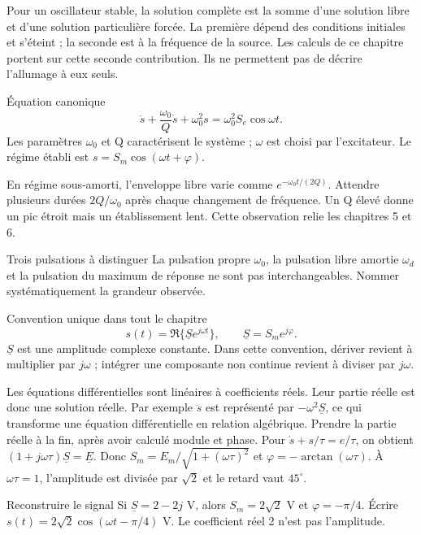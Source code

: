 Pour un oscillateur stable, la solution complète est la somme d’une solution libre et d’une solution particulière forcée. La première dépend des conditions initiales et s’éteint ; la seconde est à la fréquence de la source. Les calculs de ce chapitre portent sur cette seconde contribution. Ils ne permettent pas de décrire l’allumage à eux seuls.
\begin{loi}{Équation canonique}
\[\ddot s+\frac{\omega_0}{Q}\dot s+\omega_0^2s=\omega_0^2 S_e\cos\omega t.\]Les paramètres $\omega_0$ et Q caractérisent le système ; $\omega$ est choisi par l’excitateur. Le régime établi est $s=S_m\cos(\omega t+\varphi)$.
\end{loi}
En régime sous-amorti, l’enveloppe libre varie comme $e^{-\omega_0t/(2Q)}$. Attendre plusieurs durées $2Q/\omega_0$ après chaque changement de fréquence. Un Q élevé donne un pic étroit mais un établissement lent. Cette observation relie les chapitres 5 et 6.
\begin{piege}{Trois pulsations à distinguer}
La pulsation propre $\omega_0$, la pulsation libre amortie $\omega_d$ et la pulsation du maximum de réponse ne sont pas interchangeables. Nommer systématiquement la grandeur observée.
\end{piege}


\begin{loi}{Convention unique dans tout le chapitre}
\[s(t)=\Re\{\underline S e^{j\omega t}\},\qquad \underline S=S_m e^{j\varphi}.\]$\underline S$ est une amplitude complexe constante. Dans cette convention, dériver revient à multiplier par $j\omega$ ; intégrer une composante non continue revient à diviser par $j\omega$.
\end{loi}
Les équations différentielles sont linéaires à coefficients réels. Leur partie réelle est donc une solution réelle. Par exemple $\ddot s$ est représenté par $-\omega^2\underline S$, ce qui transforme une équation différentielle en relation algébrique. Prendre la partie réelle à la fin, après avoir calculé module et phase.
Pour $\dot s+s/\tau=e/\tau$, on obtient $(1+j\omega\tau)\underline S=\underline E$. Donc $S_m=E_m/\sqrt{1+(\omega\tau)^2}$ et $\varphi=-\arctan(\omega\tau)$. À $\omega\tau=1$, l’amplitude est divisée par $\sqrt2$ et le retard vaut $45^\circ$.
\begin{methode}{Reconstruire le signal}
Si $\underline S=2-2j$ V, alors $S_m=2\sqrt2$ V et $\varphi=-\pi/4$. Écrire $s(t)=2\sqrt2\cos(\omega t-\pi/4)$ V. Le coefficient réel 2 n’est pas l’amplitude.
\end{methode}


